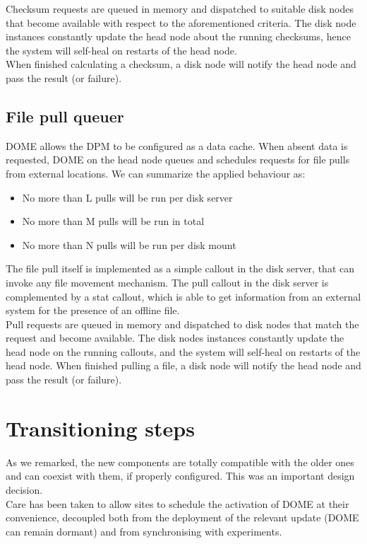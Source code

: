 \documentclass[a4paper]{jpconf}
\begin{document}
 Checksum requests are queued in memory and dispatched to suitable disk nodes that become available with respect to the aforementioned criteria. The disk node instances
 constantly update the head node about the running checksums, hence the system will self-heal on restarts of the head node.\\
 When finished calculating a checksum, a disk node will notify the head node and pass the result (or failure).\\
 
\subsection{File pull queuer}
DOME allows the DPM to be configured as a data cache. When absent data is requested, DOME on the head node queues and schedules requests for file pulls from external locations. We can summarize the applied behaviour as:
 \begin{itemize}
  \item No more than L pulls will be run per disk server\\
  \item No more than M pulls will be run in total\\
  \item No more than N pulls will be run per disk mount\\
 \end{itemize}
 
The file pull itself is implemented as a simple callout in the disk server, that can invoke any file movement mechanism.
The pull callout in the disk server is complemented by a stat callout, which is able to get information from
an external system for the presence of an offline file.\\

Pull requests are queued in memory and dispatched to disk nodes that match the request and become available.
The disk nodes instances constantly update the head node on the running callouts, and the system will self-heal
on restarts of the head node. When finished pulling a file, a disk node will notify the head node and pass the result (or failure).\\

\section{Transitioning steps}
As we remarked, the new components are totally compatible with the older ones and can coexist with them, if properly configured. This was an important design decision.\\ Care has been taken to allow sites to schedule the activation of DOME at their convenience, decoupled both from the deployment of the relevant update (DOME can remain dormant) and from synchronising with experiments.
\end{document}
